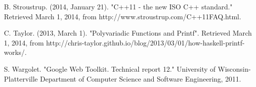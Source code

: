 \documentclass[preprint]{sigplanconf}
\begin{document}
\begin{thebibliography}{}
B. Stroustrup. (2014, January 21). "C++11 - the new ISO C++ standard." Retrieved March 1, 2014, from http://www.stroustrup.com/C++11FAQ.html.

C. Taylor. (2013, March 1). "Polyvariadic Functions and Printf". Retrieved March 1, 2014, from http://chris-taylor.github.io/blog/2013/03/01/how-haskell-printf-works/.

S. Wargolet. "Google Web Toolkit. Technical report 12." University of Wisconsin-Platterville Department of Computer Science and Software Engineering, 2011.

\end{thebibliography}
\end{document}

